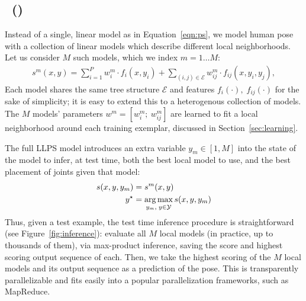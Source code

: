 \subsection{\LLPSlong~(\LLPS)}
Instead of a single, linear model as in Equation~\ref{eqn:ps}, we model human pose with a collection of linear models which describe different local neighborhoods.  Let us consider $M$ such models, which we index $m = 1 \ldots M$:
\begin{align}
s^m(x,y) = \sum_{i=1}^P w^m_i \cdot f_i(x,y_i) + \sum_{(i,j) \in \mathcal{E}} w^m_{ij} \cdot f_{ij}(x,y_i,y_j),
\end{align}
Each model shares the same tree structure $\mathcal{E}$ and features $f_i(\cdot),\; f_{ij}(\cdot)$ for the sake of simplicity; it is easy to extend this to a heterogenous collection of models.  The $M$ models' parameters $w^m = [w^m_i;~w^m_{ij}]$ are learned to fit a local neighborhood around each training exemplar, discussed in Section~\ref{sec:learning}.

The full LLPS model introduces an extra variable $y_m \in [1,M]$ into the state of the model to infer, at test time, both the best local model to use, and the best placement of joints given that model:
\begin{align}
s(x,y,y_m) &= s^m(x,y) \\
y^\star &= \mathop{\arg\max}_{y_m,\; y \in \mathcal{Y}} s(x,y,y_m) 
\end{align}
Thus, given a test example, the test time inference procedure is straightforward (see Figure~\ref{fig:inference}): evaluate all $M$ local models (in practice, up to thousands of them), via max-product inference, saving the score and highest scoring output sequence of each.  Then, we take the highest scoring of the $M$ local models and its output sequence as a prediction of the pose.  This is transparently parallelizable and fits easily into a popular parallelization frameworks, such as MapReduce.

